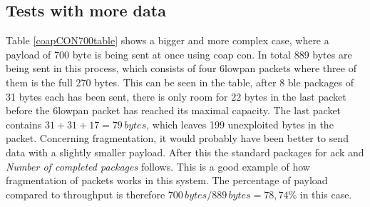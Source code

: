 \subsection{Tests with more data}


\noindent Table \ref{coapCON700table} shows a bigger and more complex case, where a payload of 700 byte is being sent at once using \gls{coap} \gls{con}. In total 889 bytes are being sent in this process, which consists of four \gls{6lowpan} packets where three of them is the full 270 bytes. This can be seen in the table, after 8 \gls{ble} packages of 31 bytes each has been sent, there is only room for 22 bytes in the last packet before the \gls{6lowpan} packet has reached its maximal capacity. The last packet contains $31+31+17 = 79 \, bytes$, which leaves 199 unexploited bytes in the packet. Concerning fragmentation, it would probably have been better to send data with a slightly smaller payload. After this the standard packages for \gls{ack} and \textit{Number of completed packages} follows. This is a good example of how fragmentation of packets works in this system.  The percentage of \gls{payload} compared to \gls{throughput} is therefore $700 \, bytes/889 \, bytes = 78,74 \%$ in this case. 

